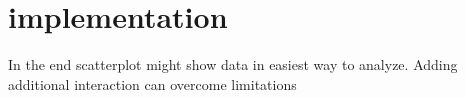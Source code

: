 \section{implementation}\label{sec:implemenation}
In the end scatterplot might show data in easiest way to analyze. Adding additional interaction can overcome limitations

